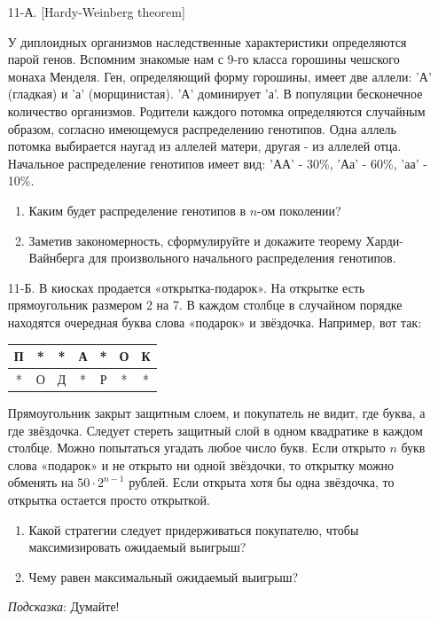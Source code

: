\begin{enumerate}
\item[11-А.] [Hardy-Weinberg theorem]

У диплоидных организмов наследственные характеристики определяются
парой генов. Вспомним знакомые нам с 9-го класса горошины чешского
монаха Менделя. Ген, определяющий форму горошины, имеет две
аллели:  'А' (гладкая) и 'а' (морщинистая). 'А' доминирует 'а'. В
популяции бесконечное количество организмов. Родители каждого
потомка определяются случайным образом, согласно имеющемуся
распределению генотипов. Одна аллель потомка выбирается наугад из
аллелей матери, другая - из аллелей отца. Начальное распределение
генотипов имеет вид: 'АА' - 30\%, 'Аа' - 60\%, 'аа' - 10\%.
\begin{enumerate}
\item Каким будет распределение генотипов в $n$-ом поколении?
\item Заметив закономерность, сформулируйте и докажите теорему
Харди-Вайнберга для произвольного начального распределения
генотипов.
\end{enumerate}

\item[11-Б.] В киосках продается «открытка-подарок». На открытке есть
прямоугольник размером 2 на 7. В каждом столбце в случайном
порядке находятся очередная буква слова «подарок» и звёздочка.
Например, вот так:

\begin{tabular}{|c|c|c|c|c|c|c|}
  \hline
  П & * & * & А & * & О & К \\
  \hline
  * & О & Д & * & Р & * & * \\
  \hline
\end{tabular}

Прямоугольник закрыт защитным слоем, и покупатель не видит, где
буква, а где звёздочка. Следует стереть защитный слой в одном
квадратике в каждом столбце. Можно попытаться угадать любое число
букв. Если открыто $n$ букв слова «подарок» и не открыто ни одной
звёздочки, то открытку можно обменять на $50\cdot 2^{n-1}$ рублей.
Если открыта хотя бы одна звёздочка, то открытка
остается просто открыткой.
\begin{enumerate}
\item Какой стратегии следует придерживаться покупателю, чтобы
максимизировать ожидаемый выигрыш?
\item Чему равен максимальный ожидаемый выигрыш?
\end{enumerate}
\emph{Подсказка}: Думайте!
\end{enumerate}
